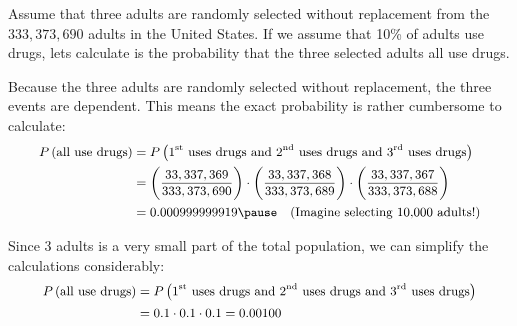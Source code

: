 \documentclass{beamer}
\newcommand{\prob}[1]{P\left(#1\right)}
\begin{document}
\begin{frame}
\begin{example}
Assume that three adults are randomly selected without replacement from the $333,373,690$ adults in the United States. If we assume that 10\% of adults use drugs, lets calculate is the probability that the three selected adults all use drugs.\pause

\vspace{1mm}
Because the three adults are randomly selected without replacement, the three events are dependent. This means the exact probability is rather cumbersome to calculate:
\vspace{-1mm}
\begin{equation*}\small
\begin{aligned}
\prob{\text{\small all use drugs}} &= \prob{\text{\small $1^{\text{st}}$ uses drugs and $2^{\text{nd}}$ uses drugs and $3^{\text{rd}}$ uses drugs}}\\
&=\left(\dfrac{33,337,369}{333,373,690}\right)\cdot\left(\dfrac{33,337,368}{333,373,689}\right)\cdot\left(\dfrac{33,337,367}{333,373,688}\right)\\
&=0.000999999919\pause\quad\text{(Imagine selecting 10,000 adults!)}
\end{aligned}
\end{equation*}\pause

\vspace{-1mm}
Since 3 adults is a very small part of the total population, we can simplify the calculations considerably:
\vspace{-2mm}
\begin{equation*}\small
\begin{aligned}
\prob{\text{\small all use drugs}} &= \prob{\text{$1^{\text{st}}$ uses drugs and $2^{\text{nd}}$ uses drugs and $3^{\text{rd}}$ uses drugs}}\\
&=0.1\cdot0.1\cdot0.1=0.00100
\end{aligned}
\end{equation*}
\end{example}
\end{frame}
\end{document}
